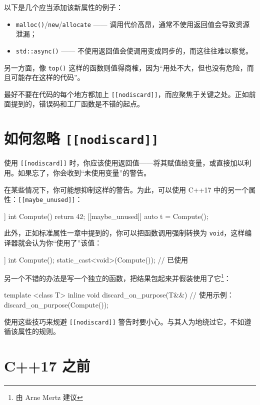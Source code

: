 以下是几个应当添加该新属性的例子：
\begin{itemize}
\item \texttt{malloc()}/\texttt{new}/\texttt{allocate} —— 调用代价高昂，通常不使用返回值会导致资源泄漏；
\item \texttt{std::async()} —— 不使用返回值会使调用变成同步的，而这往往难以察觉。
\end{itemize}

另一方面，像 \texttt{top()} 这样的函数则值得商榷，因为“用处不大，但也没有危险，而且可能存在这样的代码”。

最好不要在代码的每个地方都加上 \texttt{\texttt{[[nodiscard]]}}，而应聚焦于关键之处。正如前面提到的，错误码和工厂函数是不错的起点。

\section{如何忽略 \texttt{\texttt{[[nodiscard]]}}}

使用 \texttt{\texttt{[[nodiscard]]}} 时，你应该使用返回值——将其赋值给变量，或直接加以利用。如果忘了，你会收到“未使用变量”的警告。

在某些情况下，你可能想抑制这样的警告。为此，可以使用 C++17 中的另一个属性：\texttt{\texttt{[[maybe\_unused]]}}：

\begin{codebox}[cpp]
[[nodiscard]] int Compute() { return 42; }
[[maybe_unused]] auto t = Compute();
\end{codebox}

此外，正如标准属性一章中提到的，你可以把函数调用强制转换为 \texttt{void}，这样编译器就会认为你“使用了”该值：

\begin{codebox}[cpp]
[[nodiscard]] int Compute();
static_cast<void>(Compute()); // 已使用
\end{codebox}

另一个不错的办法是写一个独立的函数，把结果包起来并假装使用了它\footnote{由 Arne Mertz 建议}：

\begin{codebox}[cpp]
template <class T> inline void discard_on_purpose(T&&) {}
// 使用示例：
discard_on_purpose(Compute());
\end{codebox}

使用这些技巧来规避 \texttt{\texttt{[[nodiscard]]}} 警告时要小心。与其人为地绕过它，不如遵循该属性的规则。

\section{C++17 之前}

